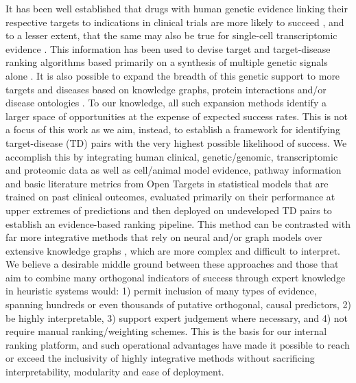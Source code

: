 \documentclass{article}
\begin{document}
It has been well established that drugs with human genetic evidence linking their respective targets to indications in clinical trials are more likely to succeed \cite{Nelson2015-eg,King2019-rc,Minikel2023.06.23.23291765,Razuvayevskaya2023.02.07.23285407,PMID:30652614,PMID:24833294,PMID:35804044,PMID:37803084,PMID:36963162}, and to a lesser extent, that the same may also be true for single-cell transcriptomic evidence \cite{Dann2024.04.04.24305313}. This information has been used to devise target and target-disease ranking algorithms based primarily on a synthesis of multiple genetic signals alone \cite{PMID:38172303,Koscielny2017-rr,PMID:31253980}. It is also possible to expand the breadth of this genetic support to more targets and diseases based on knowledge graphs, protein interactions and/or disease ontologies \cite{PMID:33262371,Bao2022-bq,Sadler2023-xd,PMID:36087372,PMID:36823319}. To our knowledge, all such expansion methods identify a larger space of opportunities at the expense of expected success rates. This is not a focus of this work as we aim, instead, to establish a framework for identifying target-disease (TD) pairs with the very highest possible likelihood of success. We accomplish this by integrating human clinical, genetic/genomic, transcriptomic and proteomic data as well as cell/animal model evidence, pathway information and basic literature metrics from Open Targets \cite{Koscielny2017-rr} in statistical models that are trained on past clinical outcomes, evaluated primarily on their performance at upper extremes of predictions and then deployed on undeveloped TD pairs to establish an evidence-based ranking pipeline. This method can be contrasted with far more integrative methods that rely on neural and/or graph models over extensive knowledge graphs \cite{Paliwal2020-hr,PMID:33741907,pittala2020relationweighted,PMID:32750869}, which are more complex and difficult to interpret. We believe a desirable middle ground between these approaches and those that aim to combine many orthogonal indicators of success through expert knowledge in heuristic systems \cite{PMID:38404138,Koscielny2017-rr} would: 1) permit inclusion of many types of evidence, spanning hundreds or even thousands of putative orthogonal, causal predictors, 2) be highly interpretable, 3) support expert judgement where necessary, and 4) not require manual ranking/weighting schemes. This is the basis for our internal ranking platform, and such operational advantages have made it possible to reach or exceed the inclusivity of highly integrative methods without sacrificing interpretability, modularity and ease of deployment.
\end{document}

